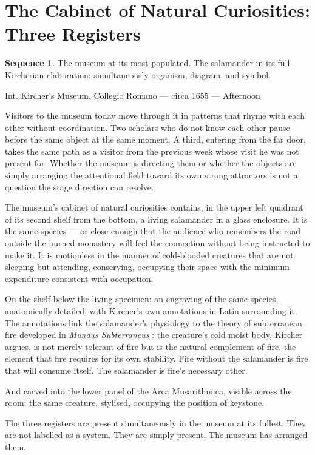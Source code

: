 \documentclass[12pt, a4paper, twoside]{memoir}
\theoremstyle{definition}
\newtheorem{sequence}{Sequence}[chapter]
\theoremstyle{remark}
\newenvironment{sceneheading}{%
  \vspace{8pt}%
  \noindent\begin{mdframed}[
    linecolor=arkgold,
    linewidth=0.8pt,
    leftmargin=0pt,
    rightmargin=0pt,
    innerleftmargin=6pt,
    innerrightmargin=6pt,
    innertopmargin=4pt,
    innerbottommargin=4pt,
    backgroundcolor=arkgold!6
  ]%
  \noindent\textsc\bgroup\small
}{%
  \egroup\end{mdframed}\vspace{4pt}%
}
\newenvironment{action}{%
  \vspace{4pt}%
  \noindent\begin{minipage}{\linewidth}%
  \setlength{\parindent}{0pt}%
  \itshape\color{kircherink}%
}{%
  \end{minipage}\vspace{6pt}%
}
\newenvironment{museumnote}{%
  \vspace{4pt}%
  \noindent\begin{mdframed}[
    linecolor=arkgold!60,
    linewidth=0.4pt,
    leftline=true, rightline=false, topline=false, bottomline=false,
    innerleftmargin=8pt,
    innerrightmargin=0pt,
    innertopmargin=2pt,
    innerbottommargin=2pt,
    backgroundcolor=arkgold!4
  ]%
  \footnotesize\color{plaguegrey}%
}{%
  \end{mdframed}\vspace{4pt}%
}
\newcommand{\salamander}[1]{%
  \marginnote{\color{arkgold!80}\scriptsize\bfseries[S\,#1]}%
}
\begin{document}
\clearpage

\section{The Cabinet of Natural Curiosities: Three Registers}

\begin{sequence}
\label{seq:cabinet}
The museum at its most populated. The salamander in its full Kircherian elaboration: simultaneously organism, diagram, and symbol.
\end{sequence}

\begin{sceneheading}
Int. Kircher's Museum, Collegio Romano --- circa 1655 --- Afternoon
\end{sceneheading}

\begin{museumnote}
Visitors to the museum today move through it in patterns that rhyme with each other without coordination. Two scholars who do not know each other pause before the same object at the same moment. A third, entering from the far door, takes the same path as a visitor from the previous week whose visit he was not present for. Whether the museum is directing them or whether the objects are simply arranging the attentional field toward its own strong attractors is not a question the stage direction can resolve.
\end{museumnote}

\begin{action}
\salamander{II} The museum's cabinet of natural curiosities contains, in the upper left quadrant of its second shelf from the bottom, a living salamander in a glass enclosure. It is the same species --- or close enough that the audience who remembers the road outside the burned monastery will feel the connection without being instructed to make it. It is motionless in the manner of cold-blooded creatures that are not sleeping but attending, conserving, occupying their space with the minimum expenditure consistent with occupation.

On the shelf below the living specimen: an engraving of the same species, anatomically detailed, with Kircher's own annotations in Latin surrounding it. The annotations link the salamander's physiology to the theory of subterranean fire developed in \textit{Mundus Subterraneus} \cite{kircher1665}: the creature's cold moist body, Kircher argues, is not merely tolerant of fire but is the natural complement of fire, the element that fire requires for its own stability. Fire without the salamander is fire that will consume itself. The salamander is fire's necessary other.

And carved into the lower panel of the Arca Musarithmica, visible across the room: the same creature, stylised, occupying the position of keystone.

The three registers are present simultaneously in the museum at its fullest. They are not labelled as a system. They are simply present. The museum has arranged them.
\end{action}
\end{document}
